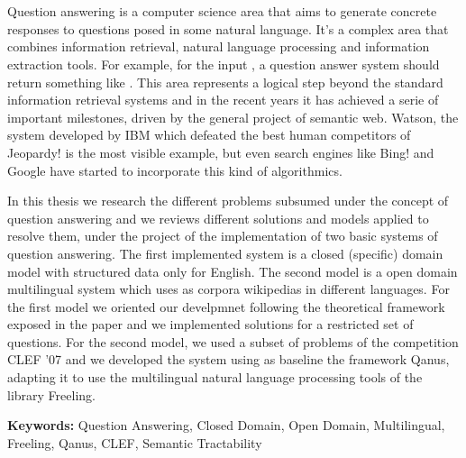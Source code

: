 \chapter*{\runtitle}
Question answering is a computer science area that aims to generate concrete responses to questions posed in some natural language. It's a complex area that combines information retrieval, natural language processing and information extraction tools. For example, for the input \textit{}, a question answer system should return something like .
This area represents a logical step beyond the standard information retrieval systems and in the recent years it has achieved a serie of important milestones, driven by the general project of semantic web. Watson, the system developed by IBM which defeated the best human competitors of Jeopardy! is the most visible example, but even search engines like Bing! and Google have started to incorporate this kind of algorithmics.

In this thesis we research the different problems subsumed under the concept of question answering and we reviews different solutions and models applied to resolve them, under the project of the implementation of two basic systems of question answering. The first implemented system is a closed (specific) domain model with structured data only for English. The second model is a open domain multilingual system which uses as corpora wikipedias in different languages. For the first model we oriented our develpmnet following the theoretical framework exposed in the paper \cite{QADB1} and we implemented solutions for a restricted set of questions. For the second model, we used a subset of problems of the competition CLEF '07 and we developed the system using as baseline the framework Qanus, adapting it to use the multilingual natural language processing tools of the library Freeling.
\bigskip

\noindent\textbf{Keywords:} Question Answering, Closed Domain, Open Domain, Multilingual, Freeling, Qanus, CLEF, Semantic Tractability